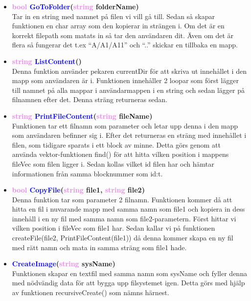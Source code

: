 \documentclass[a4paper,11pt]{article}
\newcommand{\colorFunction}[1]{\textcolor{blue}{#1}}
\newcommand{\colorType}[1]{\textcolor{violet}{#1}}
\begin{document}
\begin{itemize}
\item \textbf{\colorType{bool} \colorFunction{GoToFolder}(\colorType{string} folderName)} \\
Tar in en string med namnet på filen vi vill gå till. Sedan så skapar funktionen en char array som den kopierar in strängen i. Om det är en korrekt filepath som matats in så tar den användaren dit. Även om det är flera så fungerar det t.ex “A/A1/A11” och “..” skickar en tillbaka en mapp.

\item \textbf{\colorType{string} \colorFunction{ListContent}()} \\
Denna funktion använder pekaren currentDir för att skriva ut innehållet i den mapp som användaren är i. Funktionen innehåller 2 loopar som först lägger till namnet på alla mappar i användarmappen i en string och sedan lägger på filnamnen efter det. Denna sträng returneras sedan.

\item \textbf{\colorType{string} \colorFunction{PrintFileContent}(\colorType{string} fileName)} \\
Funktionen tar ett filnamn som parameter och letar upp denna i den mapp som användaren befinner sig i. Efter det returneras en sträng med innehållet i filen, som tidigare sparats i ett block av minne. Detta görs genom att använda vektor-funktionen find() för att hitta vilken position i mappens fileVec som filen ligger i. Sedan kollas vilket id filen har och hämtar informationen från samma blocknummer som id:t.

\item \textbf{\colorType{bool} \colorFunction{CopyFile}(\colorType{string} file1, \colorType{string} file2)} \\
Denna funktion tar som parameter 2 filnamn. Funktionen kommer då att hitta en fil i nuvarande mapp med samma namn som file1 och kopiera in dess innehåll i en ny fil med samma namn som file2-parametern. Först hittar vi vilken position i fileVec som file1 har. Sedan kallar vi på funktionen createFile(file2, PrintFileContent(file1)) då denna kommer skapa en ny fil med rätt namn och mata in samma sträng som file1 hade.

\item \textbf{\colorFunction{CreateImage}(\colorType{string} sysName)} \\
Funktionen skapar en textfil med samma namn som sysName och fyller denna med nödvändig data för att bygga upp filsystemet igen. Detta görs med hjälp av funktionen recursiveCreate() som nämns härnest.


\end{itemize}
\end{document}

